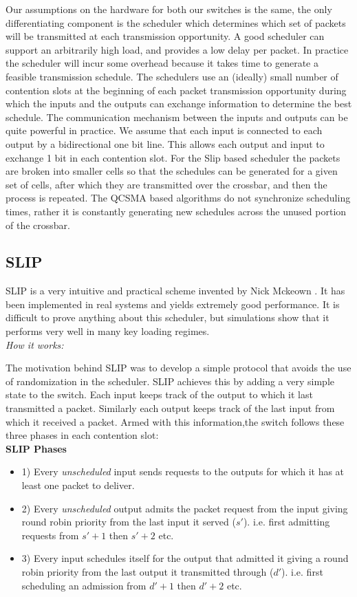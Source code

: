 \documentclass{IEEEtran}%
\begin{document}
Our assumptions on the hardware for both our switches is the same, the only differentiating component is the scheduler which determines which set of packets will be transmitted at each transmission opportunity.  A good scheduler can support an arbitrarily high load, and provides a low delay per packet.  In practice the scheduler will incur some overhead because it takes time to generate a feasible transmission schedule.  The schedulers use an (ideally) small number of contention slots at the beginning of each packet transmission opportunity during which the inputs and the outputs can exchange information to determine the best schedule.  The communication mechanism between the inputs and outputs can be quite powerful in practice.  We assume that each input is connected to each output by a bidirectional one bit line. This allows each output and input to exchange 1 bit in each contention slot.  For the Slip based scheduler the packets are broken into smaller cells so that the schedules can be generated for a given set of cells, after which they are transmitted over the crossbar, and then the process is repeated.  The QCSMA based algorithms do not synchronize scheduling times, rather it is constantly generating new schedules across the unused portion of the crossbar.

\subsection{SLIP}

SLIP is a very intuitive and practical scheme invented by Nick Mckeown \cite{McKeown}.  It has been implemented in real systems and yields extremely good performance.  It is difficult to prove anything about this scheduler, but simulations show that it performs very well in many key loading regimes.\\

{\it How it works:}

The motivation behind SLIP was to develop a simple protocol that avoids the use of randomization in the scheduler.  SLIP achieves this by adding a very simple state to the switch.  Each input keeps track of the output to which it last transmitted a packet.  Similarly each output keeps track of the last input from which it received a packet.  Armed with this information,the switch follows these three phases in each contention slot:\\

{\bf SLIP Phases}
\begin{itemize}
\item 1) Every {\it unscheduled} input sends requests to the outputs for which it has at least one packet to deliver.
\item 2) Every {\it unscheduled} output admits the packet request from the input giving round robin priority from the last input it served ($s'$). i.e. first admitting requests from $s'+1$ then $s'+2$ etc.
\item 3) Every input schedules itself for the output that admitted it giving a round robin priority from the last output it transmitted through ($d'$).  i.e. first scheduling an admission from $d'+1$ then $d'+2$ etc.\\
\end{itemize}
\end{document}

